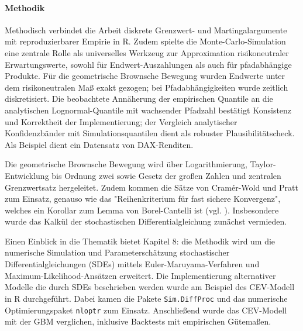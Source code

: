 \paragraph{Methodik}
Methodisch verbindet die Arbeit diskrete Grenzwert- und Martingalargumente mit 
reproduzierbarer Empirie in R. Zudem spielte die Monte-Carlo-Simulation eine zentrale Rolle als universelles Werkzeug zur Approximation risikoneutraler Erwartungswerte, sowohl für Endwert-Auszahlungen als auch für pfadabhängige Produkte. Für die geometrische Brownsche Bewegung wurden Endwerte unter dem risikoneutralen Maß exakt gezogen; bei Pfadabhängigkeiten wurde zeitlich diskretisiert. Die beobachtete Annäherung der empirischen Quantile an die analytischen Lognormal-Quantile mit wachsender Pfadzahl bestätigt Konsistenz und Korrektheit der Implementierung; der Vergleich analytischer Konfidenzbänder mit Simulationsquantilen dient als robuster Plausibilitätscheck.
Als Beispiel dient ein Datensatz von DAX-Renditen.

Die geometrische Brownsche Bewegung wird über Logarithmierung, Taylor-Entwicklung bis Ordnung zwei sowie Gesetz der großen Zahlen und 
zentralen Grenzwertsatz hergeleitet. Zudem kommen die Sätze von Cramér-Wold und Pratt zum Einsatz, 
genauso wie das "Reihenkriterium für fast sichere Konvergenz", welches 
ein Korollar zum Lemma von Borel-Cantelli ist (vgl. \cite{henze}). Insbesondere wurde das Kalkül der stochastischen Differentialgleichung zunächst vermieden.

Einen Einblick in die Thematik bietet Kapitel 8: die Methodik wird um die numerische Simulation und Parameterschätzung stochastischer Differentialgleichungen (SDEs) mittels Euler-Maruyama-Verfahren und Maximum-Likelihood-Ansätzen erweitert. 
Die Implementierung alternativer Modelle die durch SDEs beschrieben werden wurde am Beispiel des CEV-Modell in R durchgeführt.
Dabei kamen die Pakete \texttt{Sim.DiffProc} und das numerische Optimierungspaket \texttt{nloptr} zum Einsatz.
Anschließend wurde das CEV-Modell mit der GBM verglichen, inklusive Backtests mit empirischen Gütemaßen.
